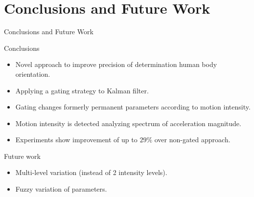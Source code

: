 \documentclass[10pt,aspectratio=1610]{beamer}
\begin{document}
\section{Conclusions and Future Work}
\label{sec:conclusions}
\begin{frame}{Conclusions and Future Work}
\begin{block}{Conclusions}

\begin{itemize}
\item Novel approach to improve precision of determination human body orientation.
\item Applying a gating strategy to Kalman filter.
\item Gating changes formerly permanent parameters according to motion intensity.
\item Motion intensity is detected analyzing spectrum of acceleration magnitude.
\item Experiments show improvement of up to $29\%$ over non-gated approach.
\end{itemize}
\end{block}	
\begin{block}{Future work}
\begin{itemize}
	\item Multi-level variation (instead of 2 intensity levels).
	\item Fuzzy variation of parameters.
\end{itemize}
\end{block}
\end{frame}


{\aauwavesbg%
\begin{frame}%
\end{frame}}
\end{document}
